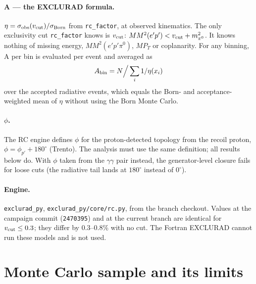\documentclass[11pt]{article}
\newcommand{\vcut}{v_{\rm cut}}
\newcommand{\mmep}{MM^2(e'p')}
\newcommand{\mmtot}{MM^2(e'p'\pi^0)}
\begin{document}
\paragraph{A --- the EXCLURAD formula.}
$\eta=\sigma_{\rm obs}(\vcut)/\sigma_{\rm Born}$ from \texttt{rc\_factor}, at observed kinematics.
The only exclusivity cut \texttt{rc\_factor} knows is $\vcut$:
$\mmep<\vcut+m_{\pi^0}^2$. It knows nothing of missing energy, $\mmtot$, $MP_T$ or coplanarity.
For any binning, A per bin is evaluated per event and averaged as
\begin{equation}
A_{\rm bin}=N\Big/\sum_i 1/\eta(x_i)
\end{equation}
over the accepted radiative events, which equals the Born- and acceptance-weighted mean of $\eta$
without using the Born Monte Carlo.

\paragraph{$\phi$.} The RC engine defines $\phi$ for the proton-detected topology from the recoil
proton, $\phi=\phi_{p'}+180^\circ$ (Trento). The analysis must use the same definition; all results
below do. With $\phi$ taken from the $\gamma\gamma$ pair instead, the generator-level closure fails
for loose cuts (the radiative tail lands at $180^\circ$ instead of $0^\circ$).

\paragraph{Engine.} \texttt{exclurad\_py}, \texttt{exclurad\_py/core/rc.py}, from the branch
checkout. Values at the campaign commit (\texttt{2470395}) and at the current branch are identical
for $\vcut\le0.3$; they differ by 0.3--0.8\% with no cut. The Fortran EXCLURAD cannot run these
models and is not used.

\section{Monte Carlo sample and its limits}
\end{document}
